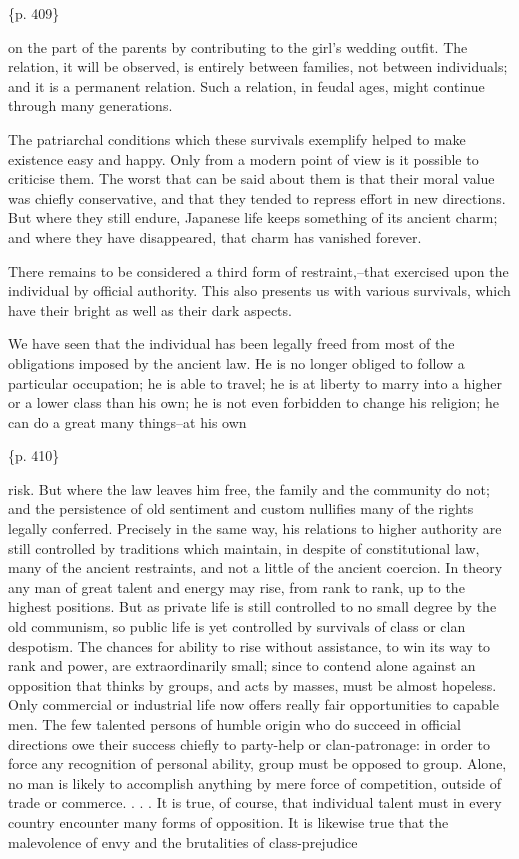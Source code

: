 \{p. 409\}

on the part of the parents by contributing to the girl's wedding outfit. The relation, it will be observed, is entirely between families, not between individuals; and it is a permanent relation. Such a relation, in feudal ages, might continue through many generations.



The patriarchal conditions which these survivals exemplify helped to make existence easy and happy. Only from a modern point of view is it possible to criticise them. The worst that can be said about them is that their moral value was chiefly conservative, and that they tended to repress effort in new directions. But where they still endure, Japanese life keeps something of its ancient charm; and where they have disappeared, that charm has vanished forever.



There remains to be considered a third form of restraint,--that exercised upon the individual by official authority. This also presents us with various survivals, which have their bright as well as their dark aspects.

We have seen that the individual has been legally freed from most of the obligations imposed by the ancient law. He is no longer obliged to follow a particular occupation; he is able to travel; he is at liberty to marry into a higher or a lower class than his own; he is not even forbidden to change his religion; he can do a great many things--at his own

\{p. 410\}

risk. But where the law leaves him free, the family and the community do not; and the persistence of old sentiment and custom nullifies many of the rights legally conferred. Precisely in the same way, his relations to higher authority are still controlled by traditions which maintain, in despite of constitutional law, many of the ancient restraints, and not a little of the ancient coercion. In theory any man of great talent and energy may rise, from rank to rank, up to the highest positions. But as private life is still controlled to no small degree by the old communism, so public life is yet controlled by survivals of class or clan despotism. The chances for ability to rise without assistance, to win its way to rank and power, are extraordinarily small; since to contend alone against an opposition that thinks by groups, and acts by masses, must be almost hopeless. Only commercial or industrial life now offers really fair opportunities to capable men. The few talented persons of humble origin who do succeed in official directions owe their success chiefly to party-help or clan-patronage: in order to force any recognition of personal ability, group must be opposed to group. Alone, no man is likely to accomplish anything by mere force of competition, outside of trade or commerce. . . . It is true, of course, that individual talent must in every country encounter many forms of opposition. It is likewise true that the malevolence of envy and the brutalities of class-prejudice

